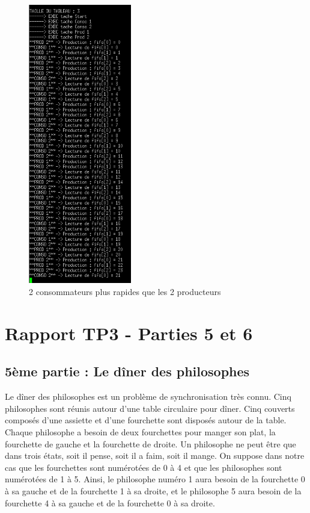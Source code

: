 \documentclass[a4paper,12pt]{report}
\begin{document}
\begin{figure}[h]
	\centering
		\includegraphics[width=0.4\textwidth]{screens/conso_plus_rapide_sem_2prod_meme_vitesse_2conso_meme_vitesse.png}
		\caption{2 consommateurs plus rapides que les 2 producteurs}
		\label{conso_plus_rapide_sem_2prod_meme_vitesse_2conso_meme_vitesse}
\end{figure}

\newpage






\chapter{Rapport TP3 - Parties 5 et 6}
\section{5ème partie : Le dîner des philosophes}

Le dîner des philosophes est un problème de synchronisation très connu. Cinq philosophes sont réunis autour d'une table circulaire pour dîner. Cinq couverts composés d'une assiette et d'une fourchette sont disposés autour de la table. Chaque philosophe a besoin de deux fourchettes pour manger son plat, la fourchette de gauche et la fourchette de droite. 
Un philosophe ne peut être que dans trois états, soit il pense, soit il a faim, soit il mange.
On suppose dans notre cas que les fourchettes sont numérotées de 0 à 4 et que les philosophes sont numérotées de 1 à 5. Ainsi, le philosophe numéro 1 aura besoin de la fourchette 0 à sa gauche et de la fourchette 1 à sa droite, et le philosophe 5 aura besoin de la fourchette 4 à sa gauche et de la fourchette 0 à sa droite.
\end{document}
